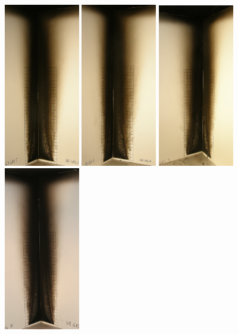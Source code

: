 \documentclass[twoside]{uocthesis}
\begin{document}
{\begin{figure}[p]
	\includegraphics[width=1.3in]{../Figures/GBGas7C_P5270587}
	\includegraphics[width=1.3in]{../Figures/GBGas8C_P5270629}
	\includegraphics[width=1.3in]{../Figures/GBGas9C_P5270689}
	\includegraphics[width=1.3in]{../Figures/GBGas10C_IMG_9818} \\


\end{figure}}
\end{document}
